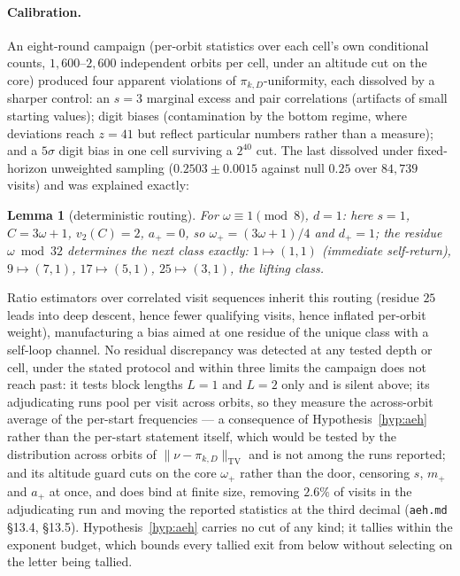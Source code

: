 \documentclass[11pt]{article}
\newtheorem{lemma}[theorem]{Lemma}
\theoremstyle{remark}
\newcommand{\vt}[1]{v_2\!\left(#1\right)}
\newcommand{\w}{\omega}
\newcommand{\wnext}{\w_{+}}
\newcommand{\dnext}{d_{+}}
\begin{document}
\paragraph{Calibration.} An eight-round campaign (per-orbit statistics over each cell's own conditional counts, $1{,}600$--$2{,}600$ independent orbits per cell, under an altitude cut on the core) produced four apparent violations of $\pi_{k,D}$-uniformity, each dissolved by a sharper control: an $s{=}3$ marginal excess and pair correlations (artifacts of small starting values); digit biases (contamination by the bottom regime, where deviations reach $z=41$ but reflect particular numbers rather than a measure); and a $5\sigma$ digit bias in one cell surviving a $2^{40}$ cut. The last dissolved under fixed-horizon unweighted sampling ($0.2503\pm0.0015$ against null $0.25$ over $84{,}739$ visits) and was explained exactly:

\begin{lemma}[deterministic routing]\label{lem:routing}
For $\w \equiv 1 \pmod 8$, $d = 1$: here $s = 1$, $C = 3\w + 1$, $\vt{C} = 2$, $a_+ = 0$, so $\wnext = (3\w+1)/4$ and $\dnext = 1$; the residue $\w \bmod 32$ determines the next class exactly: $1 \mapsto (1,1)$ (immediate self-return), $9 \mapsto (7,1)$, $17 \mapsto (5,1)$, $25 \mapsto (3,1)$, the lifting class.
\end{lemma}

Ratio estimators over correlated visit sequences inherit this routing (residue $25$ leads into deep descent, hence fewer qualifying visits, hence inflated per-orbit weight), manufacturing a bias aimed at one residue of the unique class with a self-loop channel. No residual discrepancy was detected at any tested depth or cell, under the stated protocol and within three limits the campaign does not reach past: it tests block lengths $L = 1$ and $L = 2$ only and is silent above; its adjudicating runs pool per visit across orbits, so they measure the across-orbit average of the per-start frequencies --- a consequence of Hypothesis~\ref{hyp:aeh} rather than the per-start statement itself, which would be tested by the distribution across orbits of $\lVert\nu - \pi_{k,D}\rVert_{\mathrm{TV}}$ and is not among the runs reported; and its altitude guard cuts on the core $\wnext$ rather than the door, censoring $s$, $m_+$ and $a_+$ at once, and does bind at finite size, removing $2.6\%$ of visits in the adjudicating run and moving the reported statistics at the third decimal (\texttt{aeh.md} \S13.4, \S13.5). Hypothesis~\ref{hyp:aeh} carries no cut of any kind; it tallies within the exponent budget, which bounds every tallied exit from below without selecting on the letter being tallied.
\end{document}
